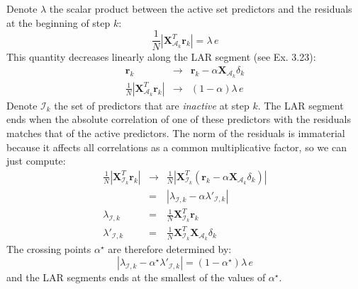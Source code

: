 

Denote $\lambda$ the scalar product between the active set predictors
and the residuals at the beginning of step $k$:
$$
\frac{1}{N}|\mathbf{X}_{\mathcal{A}_k}^T \mathbf{r}_k| = \lambda\, e
$$
This quantity decreases linearly along the LAR segment (see
Ex. 3.23):
\begin{eqnarray*}
    \mathbf{r}_k & \rightarrow & \mathbf{r}_k -  \alpha 
        \mathbf{X}_{\mathcal{A}_k} \delta_k \\
    \frac{1}{N}|\mathbf{X}_{\mathcal{A}_k}^T \mathbf{r}_k| 
        & \rightarrow &  (1 - \alpha) \lambda \,e
\end{eqnarray*}
Denote $\mathcal{I}_k$ the set of predictors that are \textit{inactive}
at step $k$. The LAR segment ends when the absolute correlation
of one of these predictors with the residuals matches that of
the active predictors. The norm of the residuals is immaterial
because it affects all correlations as a common multiplicative
factor, so we can just compute:
\begin{eqnarray*}
    \frac{1}{N} | \mathbf{X}_{\mathcal{I}_k}^T \mathbf{r}_k |
        & \rightarrow & \frac{1}{N} | \mathbf{X}_{\mathcal{I}_k}^T \left(\mathbf{r}_k - \alpha \mathbf{X}_{\mathcal{A}_k} \delta_k\right) | \\
        & = & | \lambda_{\mathcal{I}, k}  - \alpha \lambda'_{\mathcal{I}, k}|\\
    \lambda_{\mathcal{I}, k} & = & \frac{1}{N}\mathbf{X}_{\mathcal{I}_k}^T \mathbf{r}_k\\
    \lambda'_{\mathcal{I}, k} & = & \frac{1}{N}\mathbf{X}_{\mathcal{I}_k}^T 
    \mathbf{X}_{\mathcal{A}_k} \delta_k
\end{eqnarray*}
The crossing points $\alpha^\star$ are therefore determined by:
\begin{equation*}
| \lambda_{\mathcal{I}, k}  - \alpha^\star \lambda'_{\mathcal{I}, k}| = 
(1 - \alpha^\star) \lambda \,e
\end{equation*}
and the LAR segments ends at the smallest of the values of $\alpha^\star$.